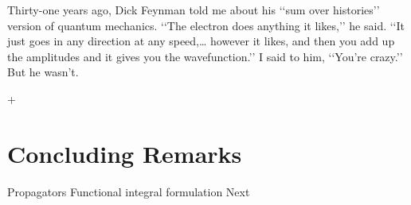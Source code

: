 \begin{savequote}[45mm]
Thirty-one years ago, Dick Feynman told me about his ‘‘sum over histories’’ version of quantum mechanics. ‘‘The electron does anything it likes,’’ he said. ‘‘It just goes in any direction at any speed,… however it likes, and then you add up the amplitudes and it gives you the wavefunction.’’ I said to him, ‘‘You’re crazy.’’ But he wasn’t.
\end{savequote}+
\chapter{Concluding Remarks}
Propagators
Functional integral formulation
Next